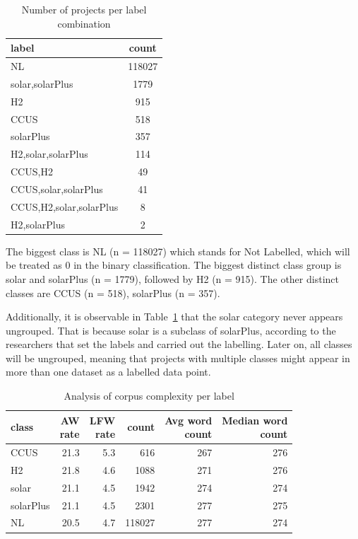 \documentclass[manuscript, anonymous=true, review=true]{acmart}
\begin{document}
\begin{table}
  \centering
  \begin{tabular}{lc}
      \hline
        label & count \\
        \hline
        NL                    & 118027 \\
        solar,solarPlus       & 1779   \\
        H2                    & 915    \\
        CCUS                  & 518    \\
        solarPlus             & 357    \\
        H2,solar,solarPlus    & 114    \\
        CCUS,H2               & 49     \\
        CCUS,solar,solarPlus  & 41     \\
        CCUS,H2,solar,solarPlus & 8    \\
        H2,solarPlus          & 2      \\\hline
  \end{tabular}
  \caption{Number of projects per label combination}\label{table:labels}
\end{table}

The biggest class is NL (n = 118027) which stands for Not Labelled, which will be treated as 0 in the binary classification. The biggest distinct class group is solar and solarPlus (n = 1779), followed by H2 (n = 915). The other distinct classes are CCUS (n = 518),
solarPlus (n = 357).

Additionally, it is observable in Table~\ref{table:labels} that the solar category never appears ungrouped. That is because solar is a subclass of solarPlus, according to the researchers that set the labels and carried out the labelling.
Later on, all classes will be ungrouped, meaning that projects with multiple classes might appear in more than one dataset as a labelled data point.

\begin{table}
  \centering
    \begin{tabular}{lrrrrr}
      \hline
      class & \thead{AW \\ rate} & \thead{LFW \\ rate} & count & \thead{Avg word \\ count} & \thead{Median word \\ count} \\
      \hline
      CCUS & 21.3 & 5.3 & 616 & 267 & 276 \\
      H2 & 21.8 & 4.6 & 1088 & 271 & 276 \\
      solar & 21.1 & 4.5 & 1942 & 274 & 274 \\
      solarPlus & 21.1 & 4.5 & 2301 & 277 & 275 \\
      NL & 20.5 & 4.7 & 118027 & 277 & 274 \\
      \hline
    \end{tabular}
    \caption{Analysis of corpus complexity per label}
    \label{table:classDesc}
\end{table}
\end{document}
